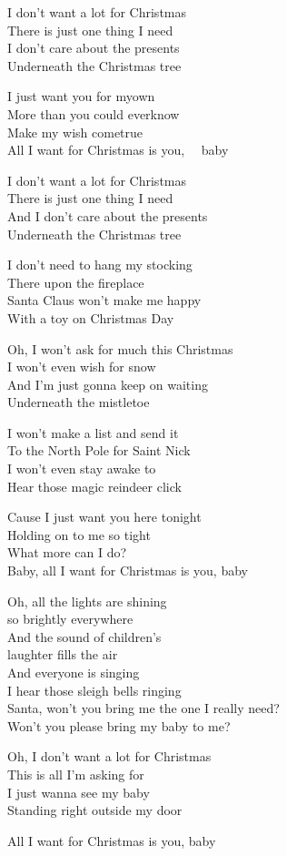 
\ve{}
I don't want a lot for Christmas\\
There is just one thing I need\\
I don't care about the presents\\
Underneath the Christmas tree

\cho{}
I just want you for myown\\
More than you could everknow\\
Make my wish cometrue\\
All I want for Christmas is you,  \ \ baby

\ve{}
I don't want a lot for Christmas\\
There is just one thing I need\\
And I don't care about the presents\\
Underneath the Christmas tree

\ve{}
I don't need to hang my stocking\\
There upon the fireplace\\
Santa Claus won't make me happy\\
With a toy on Christmas Day

\cho{}

\ve{}
Oh, I won't ask for much this Christmas\\
I won't even wish for snow\\
And I'm just gonna keep on waiting\\
Underneath the mistletoe

\ve{}
I won't make a list and send it\\
To the North Pole for Saint Nick\\
I won't even stay awake to\\
Hear those magic reindeer click

\cho{}
Cause I just want you here tonight\\
Holding on to me so tight\\
What more can I do?\\
Baby, all I want for Christmas is you, baby

\ve{}
Oh, all the lights are shining\\ 
so brightly everywhere\\
And the sound of children's\\ 
laughter fills the air\\
And everyone is singing\\
I hear those sleigh bells ringing\\
Santa, won't you bring me the one I really need?\\
Won't you please bring my baby to me?

\ve{}
Oh, I don't want a lot for Christmas\\
This is all I'm asking for\\
I just wanna see my baby\\
Standing right outside my door

\cho{}

\re{}
All I want for Christmas is you, baby

\esong{}
